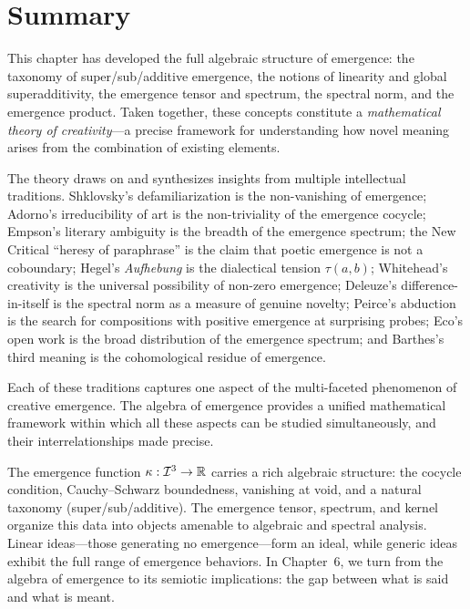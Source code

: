 \section{Summary}

\begin{interpretation}\label{interp:ch5:emergence_creativity}
This chapter has developed the full algebraic structure of emergence:
the taxonomy of super/sub/additive emergence, the notions of linearity
and global superadditivity, the emergence tensor and spectrum, the
spectral norm, and the emergence product. Taken together, these concepts
constitute a \emph{mathematical theory of creativity}---a precise
framework for understanding how novel meaning arises from the
combination of existing elements.

The theory draws on and synthesizes insights from multiple intellectual
traditions. Shklovsky's defamiliarization is the non-vanishing of
emergence; Adorno's irreducibility of art is the non-triviality of the
emergence cocycle; Empson's literary ambiguity is the breadth of the
emergence spectrum; the New Critical ``heresy of paraphrase'' is the
claim that poetic emergence is not a coboundary; Hegel's \emph{Aufhebung}
is the dialectical tension $\tau(a,b)$; Whitehead's creativity is the
universal possibility of non-zero emergence; Deleuze's difference-in-itself
is the spectral norm as a measure of genuine novelty; Peirce's abduction
is the search for compositions with positive emergence at surprising
probes; Eco's open work is the broad distribution of the emergence
spectrum; and Barthes's third meaning is the cohomological residue of
emergence.

Each of these traditions captures one aspect of the multi-faceted
phenomenon of creative emergence. The algebra of emergence provides
a unified mathematical framework within which all these aspects can
be studied simultaneously, and their interrelationships made precise.
\end{interpretation}

The emergence function $\kappa : \mathcal{I}^3 \to \mathbb{R}$ carries a rich algebraic
structure: the cocycle condition, Cauchy--Schwarz boundedness, vanishing at
void, and a natural taxonomy (super/sub/additive). The emergence tensor,
spectrum, and kernel organize this data into objects amenable to algebraic
and spectral analysis. Linear ideas---those generating no emergence---form
an ideal, while generic ideas exhibit the full range of emergence behaviors.
In Chapter~6, we turn from the algebra of emergence to its semiotic
implications: the gap between what is said and what is meant.


